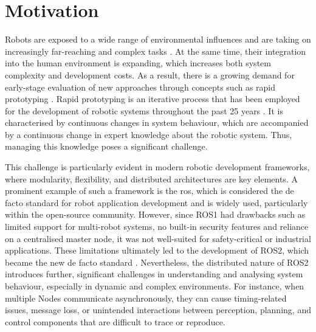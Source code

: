\chapter{Motivation} \label{chap:motivation}

Robots are exposed to a wide range of environmental influences and are taking on increasingly far-reaching and complex tasks \cite{riseofrobots}. At the same time, their integration into the human environment is expanding, which increases both system complexity and development costs. As a result, there is a growing demand for early-stage evaluation of new approaches through concepts such as rapid prototyping \cite[p.~5]{rapidPrototyping}\cite[p.~161]{initialThoughtsOnRapidProto}. Rapid prototyping is an iterative process that has been employed for the development of robotic systems throughout the past 25 years \cite{RP1}\cite{RP2}\cite{RP3}\cite{RP4}. It is characterised by continuous changes in system behaviour, which are accompanied by a continuous change in expert knowledge about the robotic system. Thus, managing this knowledge poses a significant challenge.

This challenge is particularly evident in modern robotic development frameworks, where modularity, flexibility, and distributed architectures are key elements. A prominent example of such a framework is the \acf{ros}, which is considered the \glqq{}de facto standard for robot application development\grqq{} \cite[p.~2545]{runtimeVerfificationAndFieldBaseTesting} and is widely used, particularly within the open-source community. However, since ROS1 had drawbacks such as limited support for multi-robot systems, no built-in security features and reliance on a centralised master node, it was not well-suited for safety-critical or industrial applications. These limitations ultimately led to the development of ROS2, which became the new de facto standard \cite[p.~80]{ros2isstandard}.
Nevertheless, the distributed nature of ROS2 introduces further, significant challenges in understanding and analysing system behaviour, especially in dynamic and complex environments. For instance, when multiple Nodes communicate asynchronously, they can cause timing-related issues, message loss, or unintended interactions between perception, planning, and control components that are difficult to trace or reproduce.

